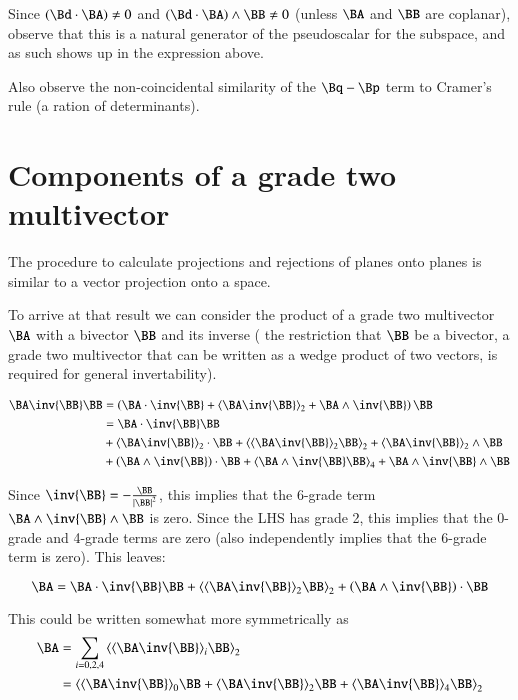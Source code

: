 Since $(\Bd \cdot \BA) \ne 0$ and $(\Bd \cdot \BA) \wedge \BB \ne 0$ (unless $\BA$ and $\BB$ are coplanar), observe that this is a natural generator of the pseudoscalar for the subspace, and as such shows up in the expression above.

Also observe the non-coincidental similarity of the $\Bq-\Bp$ term to Cramer's rule (a ration of determinants).

\section{Components of a grade two multivector }

The procedure to calculate projections and rejections of planes onto planes is similar to a vector projection onto a space.

To arrive at that result we can consider the product of a grade two multivector $\BA$ with a bivector $\BB$ and its inverse (
the restriction that $\BB$ be a bivector, a grade two multivector that can be written as a wedge product of two vectors, is required for general invertability).

\begin{align*}
\BA\inv{\BB}\BB 
&= \left(\BA \cdot \inv{\BB} + \gpgradetwo{ \BA \inv{\BB} } + \BA \wedge \inv{\BB}\right) \BB \\
&= 
\BA \cdot \inv{\BB} \BB \\
&
+\gpgradetwo{ \BA \inv{\BB} } \cdot \BB 
+\gpgradetwo{ \gpgradetwo{ \BA \inv{\BB} } \BB }
+\gpgradetwo{ \BA \inv{\BB} } \wedge \BB \\
&
+\left(\BA \wedge \inv{\BB}\right) \cdot \BB 
+\gpgradefour{\BA \wedge \inv{\BB} \BB}
+\BA \wedge \inv{\BB} \wedge \BB \\
\end{align*}

Since $\inv{\BB} = -\frac{\BB}{{\Abs{\BB}}^2}$, this implies that the 6-grade term $\BA \wedge \inv{\BB} \wedge \BB$ is zero.  Since the LHS has grade 2, this implies that the 0-grade and 4-grade terms are zero (also independently implies that the 6-grade term is zero).  This leaves:

\begin{equation}
\label{eqn:bivector:bivectorprojbivector}
\BA
= 
\BA \cdot \inv{\BB} \BB \\
+\gpgradetwo{\gpgradetwo{\BA\inv{\BB}} \BB}
+\left(\BA \wedge \inv{\BB}\right) \cdot \BB 
\end{equation}

This could be written somewhat more symmetrically as
\begin{align*}
\BA
&=\sum_{i=0,2,4}\gpgradetwo{\gpgrade{\BA \inv{\BB}}{i} \BB} \\
&= \gpgradetwo{ \gpgradezero{\BA \inv{\BB}} \BB +\gpgradetwo{\BA \inv{\BB}} \BB +\gpgradefour{\BA \inv{\BB}} \BB } \\
\end{align*}

